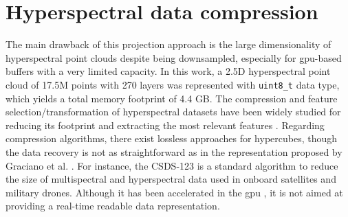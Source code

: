 \section{Hyperspectral data compression}

The main drawback of this projection approach is the large dimensionality of hyperspectral point clouds despite being downsampled, especially for \acrshort{gpu}-based buffers with a very limited capacity. In this work, a 2.5D hyperspectral point cloud of 17.5M points with 270 layers was represented with \verb|uint8_t| data type, which yields a total memory footprint of 4.4 GB. The compression and feature selection/transformation of hyperspectral datasets have been widely studied for reducing its footprint \cite{barrios_shyloc_2020, barrios_performance_2022} and extracting the most relevant features \cite{xuan_early_2022}. Regarding compression algorithms, there exist lossless approaches for hypercubes, though the data recovery is not as straightforward as in the representation proposed by Graciano et al. \cite{graciano_quadstack_2021}. For instance, the CSDS-123 \cite{barrios_shyloc_2020, barrios_performance_2022} is a standard algorithm to reduce the size of multispectral and hyperspectral data used in onboard satellites and military drones. Although it has been accelerated in the \acrshort{gpu} \cite{ferraz_hyperspectral_2021}, it is not aimed at providing a real-time readable data representation.

